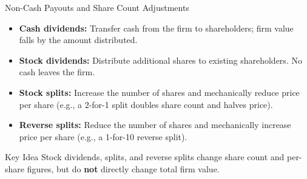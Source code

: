 \begin{frame}{Non-Cash Payouts and Share Count Adjustments}
\begin{itemize}
    \item \textbf{Cash dividends:} Transfer cash from the firm to shareholders; firm value falls by the amount distributed.

    \item \textbf{Stock dividends:} Distribute additional shares to existing shareholders. No cash leaves the firm.

    \item \textbf{Stock splits:} Increase the number of shares and mechanically reduce price per share (e.g., a 2-for-1 split doubles share count and halves price).

    \item \textbf{Reverse splits:} Reduce the number of shares and mechanically increase price per share (e.g., a 1-for-10 reverse split).
\end{itemize}

\vspace{3mm}
\begin{block}{Key Idea}
Stock dividends, splits, and reverse splits change share count and per-share figures, but do \textbf{not} directly change total firm value.
\end{block}
\end{frame}

